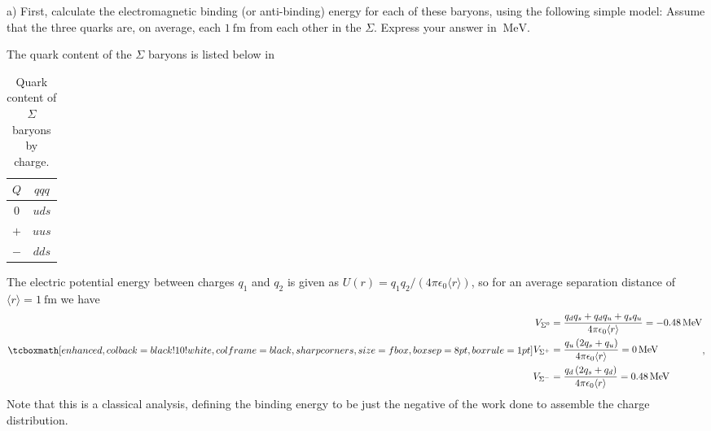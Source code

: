 \def\duedate{09/30/22}
\def\HWnum{2}

\usepackage[compat=1.1.0]{tikz-feynman}


    

a) First, calculate the electromagnetic binding (or anti-binding) energy for each of these baryons, using the following simple model: Assume that the three quarks are, on average, each $\SI{1}{\femto\m}$ from each other in the $\Sigma$.
Express your answer in $\SI{}{\MeV}$.

The quark content of the $\Sigma$ baryons is listed below in 

\begin{table}[h!]
\begin{center}
\begin{tabular}{c|c}
    $Q$ & $qqq$ \\
    \hline
    $0$ & $uds$ \\
    $+$ & $uus$ \\
    $-$ & $dds$
\end{tabular}
\end{center}
\caption{Quark content of $\Sigma$ baryons by charge.}
\label{tab:sig-quarks}
\end{table}

The electric potential energy between charges $q_1$ and $q_2$ is given as $U(r) = q_1 q_2 / (4\pi\epsilon_0\langle r \rangle)$, so for an average separation distance of $\langle r \rangle = \SI{1}{\femto\m}$ we have
\begin{eqnarray}
    \label{eq:potential-energies}
    \eqbox{
    \begin{aligned}
    V_{\Sigma^{0}} &= \frac{q_{d} q_{s} + q_{d} q_{u} + q_{s} q_{u}}{4 \pi \epsilon_{0} \langle r \rangle} = \SI{-0.48}{\MeV} \\
    V_{\Sigma^{+}} &= \frac{q_{u} \left(2 q_{s} + q_{u}\right)}{4 \pi \epsilon_{0} \langle r \rangle} = \SI{0}{\MeV} \\
    V_{\Sigma^{-}} &= \frac{q_{d} \left(2 q_{s} + q_{d}\right)}{4 \pi \epsilon_{0} \langle r \rangle} = \SI{0.48}{\MeV} 
\end{aligned}
}
,\end{eqnarray}
Note that this is a classical analysis, defining the binding energy to be just the negative of the work done to assemble the charge distribution.


